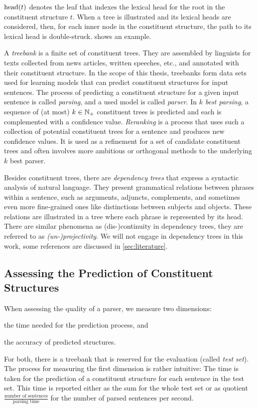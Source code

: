 \documentclass[../document.tex]{subfiles}
\begin{document}
    \(\operatorname{head}(t)\) denotes the leaf that indexes the lexical head for the root in the constituent structure \(t\).
    When a tree is illustrated and its lexical heads are considered, then, for each inner node in the constituent structure, the path to its lexical head is double-struck.
     shows an example.

    A \emph{treebank} is a finite set of constituent trees.
    They are assembled by linguists for texts collected from news articles, written speeches, etc., and annotated with their constituent structure.
    In the scope of this thesis, treebanks form data sets used for learning models that can predict constituent structures for input sentences.
    The process of predicting a constituent structure for a given input sentence is called \emph{parsing}, and a used model is called \emph{parser}.
    In \emph{\(k\) best parsing}, a sequence of (at most) \(k \in \mathbb{N}_+\) constituent trees is predicted and each is complemented with a confidence value.
    \emph{Reranking} is a process that uses such a collection of potential constituent trees for a sentence and produces new confidence values.
    It is used as a refinement for a set of candidate constituent trees and often involves more ambitious or orthogonal methods to the underlying \(k\) best parser.

    Besides constituent trees, there are \emph{dependency trees} that express a syntactic analysis of natural language.
    They present grammatical relations between phrases within a sentence, such as arguments, adjuncts, complements, and sometimes even more fine-grained ones like distinctions between subjects and objects.
    These relations are illustrated in a tree where each phrase is represented by its head.
    There are similar phenomena as (dis-)continuity in dependency trees, they are referred to as \emph{(un-)projectivity}.
    We will not engage in dependency trees in this work, some references are discussed in \cref{sec:literature}.

    \subsection{Assessing the Prediction of Constituent Structures}
    When assessing the quality of a parser, we measure two dimensions:
    \begin{inparaenum}
        \item the time needed for the prediction process, and
        \item the accuracy of predicted structures.
    \end{inparaenum}
    For both, there is a treebank that is reserved for the evaluation (called \emph{test set}).
    The process for measuring the first dimension is rather intuitive:
        The time is taken for the prediction of a constituent structure for each sentence in the test set. 
    This time is reported either as the sum for the whole test set or as quotient \(\frac{\text{number of sentences}}{\text{parsing time}}\) for the number of parsed sentences per second.
\end{document}
